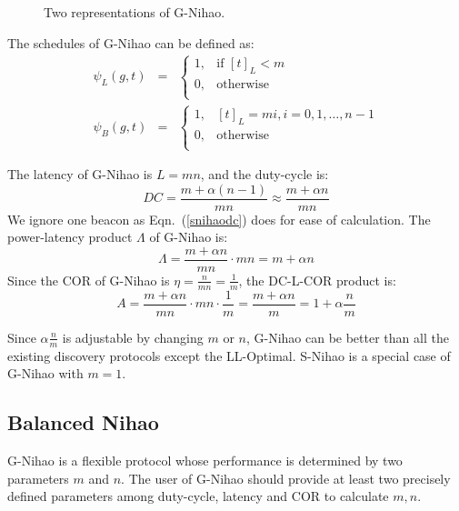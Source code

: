 \documentclass[conference]{IEEEtran}
\begin{document}
\begin{figure}[t]
    \centering
\caption{Two representations of G-Nihao.}
\end{figure}

The schedules of G-Nihao can be defined as:
\begin{eqnarray}
    \psi_L (g,t) & = & \left\{ \begin{array}{ll}
            1, & \textrm{if $[t]_L < m$} \nonumber \\
            0, & \textrm{otherwise} \nonumber \\
        \end{array} \right.
\\
    \psi_B (g,t) & = & \left\{ \begin{array}{ll}
            1, & \textrm{$[t]_L=mi, i=0,1, \ldots, n-1$} \nonumber \\
            0, & \textrm{otherwise} \nonumber \\
        \end{array} \right.
\end{eqnarray}

The latency of G-Nihao is $L=mn$, and the duty-cycle is:
\begin{displaymath}
    DC=\frac{m + \alpha (n-1)}{mn} \approx \frac{m + \alpha n}{mn}
\end{displaymath}
We ignore one beacon as Eqn.~(\ref{snihaodc}) does for ease of calculation.
The power-latency product $\Lambda$ of G-Nihao is:
\begin{displaymath}
    \Lambda = \frac{m + \alpha n}{mn} \cdot mn = m + \alpha n
\end{displaymath}
Since the COR of G-Nihao is $\eta=\frac{n}{mn}=\frac{1}{m}$, the DC-L-COR product is:
\begin{displaymath}
    A = \frac{m + \alpha n}{mn} \cdot mn \cdot \frac{1}{m} = \frac{m + \alpha n}{m} = 1 +  \alpha \frac{n}{m}
\end{displaymath}

Since $\alpha \frac{n}{m}$ is adjustable by changing $m$ or $n$, G-Nihao can be better than all the existing discovery protocols except the LL-Optimal.
S-Nihao is a special case of G-Nihao with $m=1$.

\subsection{Balanced Nihao}
G-Nihao is a flexible protocol whose performance is determined by two parameters $m$ and $n$.
The user of G-Nihao should provide at least two precisely defined parameters among duty-cycle, latency and COR to calculate $m,n$.
\end{document}
